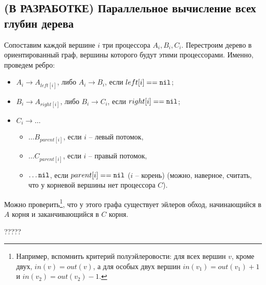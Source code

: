 \subsection{(В РАЗРАБОТКЕ) Параллельное вычисление всех глубин дерева}

 Сопоставим каждой вершине $i$ три процессора $A_i, B_i, C_i$. Перестроим дерево в ориентированный граф, вершины которого будут этими процессорами. Именно, проведем ребро:
\begin{itemize}
	\item $A_i \rightarrow A_{left[i]}$, либо $A_i \rightarrow B_i$, если $left[i] == \mathtt{nil}$;
	\item $B_i \rightarrow A_{right[i]}$, либо $B_i \rightarrow C_i$, если $right[i] == \mathtt{nil}$;
	\item $C_i \rightarrow \ldots$
	\begin{itemize}
		\item $\ldots B_{parent[i]}$, если $i$ -- левый потомок,
		\item $\ldots C_{parent[i]}$, если $i$ -- правый потомок,
		\item $\ldots \mathtt{nil}$, если $parent[i] == \mathtt{nil}$ ($i$ -- корень) (можно, наверное, считать, что у корневой вершины нет процессора $C$).
	\end{itemize}
\end{itemize}

Можно проверить\footnote{Например, вспомнить критерий полуэйлеровости: для всех вершин $v$, кроме двух, $in(v) = out(v)$, а для особых двух вершин $in(v_1) = out(v_1) + 1$ и $in(v_2) = out(v_2) - 1$.}, что у этого графа существует эйлеров обход, начинающийся в $A$ корня и заканчивающийся в $C$ корня.

?????
